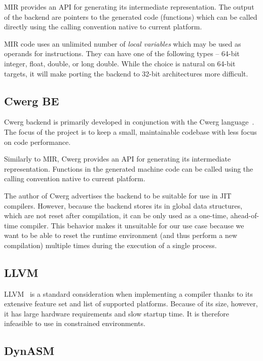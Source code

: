 MIR provides an API for generating its intermediate representation. The output of the backend are pointers to the generated code (functions) which can be called directly using the calling convention native to current platform.

MIR code uses an unlimited number of \textit{local variables} which may be used as operands for instructions. They can have one of the following types -- 64-bit integer, float, double, or long double. While the choice is natural on 64-bit targets, it will make porting the backend to 32-bit architectures more difficult.


\subsection{Cwerg BE}

Cwerg backend is primarily developed in conjunction with the Cwerg language~\cite{cwerg}. The focus of the project is to keep a small, maintainable codebase with less focus on code performance.

Similarly to MIR, Cwerg provides an API for generating its intermediate representation. Functions in the generated machine code can be called using the calling convention native to current platform.

The author of Cwerg advertises the backend to be suitable for use in JIT compilers. However, because the backend stores its in global data structures, which are not reset after compilation, it can be only used as a one-time, ahead-of-time compiler. This behavior makes it unsuitable for our use case because we want to be able to reset the runtime environment (and thus perform a new compilation) multiple times during the execution of a single process.


\subsection{LLVM}

LLVM~\cite{llvm} is a standard consideration when implementing a compiler thanks to its extensive feature set and list of supported platforms. Because of its size, however, it has large hardware requirements and slow startup time. It is therefore infeasible to use in constrained environments.


\subsection{DynASM}

